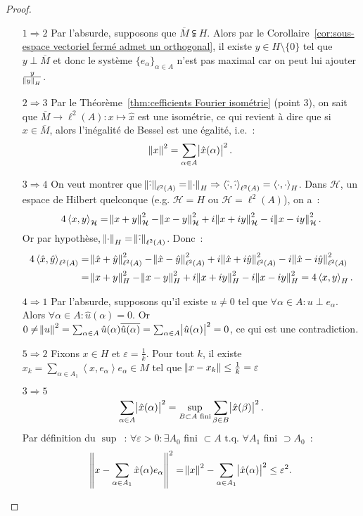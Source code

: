 \documentclass{report}
\newcommand{\scpr}[2]{\left\langle#1, #2\right\rangle}
\newcommand{\tq}{\text{ t.q. }}
\theoremstyle{definition}
\theoremstyle{remark}
\begin{document}
\begin{proof}~
\begin{itemize}
	\item[$1 \Rightarrow 2$] Par l'absurde, supposons que $\overline M \subsetneqq H$. Alors par le Corollaire~\ref{cor:sous-espace vectoriel fermé admet un orthogonal},
	il existe $y \in H \setminus \{0\}$ tel que $y \perp \overline M$ et donc le système $\{e_\alpha\}_{\alpha \in A}$ n'est pas maximal car on peut lui ajouter $\frac y{\norm y_H}$.
	\item[$2 \Rightarrow 3$] Par le Théorème~\ref{thm:cefficients Fourier isométrie} (point 3), on sait que $\overline M \to \ell^2(A) : x \mapsto \hat x$ est une isométrie,
	ce qui revient à dire que si $x \in \overline M$, alors l'inégalité de Bessel est une égalité, i.e.~:
	\[\norm x^2 = \sum_{\alpha \in A}\abs {\hat x(\alpha)}^2.\]
	\item[$3 \Rightarrow 4$] On veut montrer que $\norm {\hat \cdot}_{\ell^2(A)} = \norm \cdot_H \Rightarrow \scpr {\hat \cdot}{\hat \cdot}_{\ell^2(A)} = \scpr \cdot\cdot_H$.
	Dans $\mathcal H$, un espace de Hilbert quelconque (e.g. $\mathcal H = H$ ou $\mathcal H = \ell^2(A)$), on a~:
	\[4\scpr xy_{\mathcal H} = \norm {x+y}^2_{\mathcal H} - \norm {x-y}^2_{\mathcal H} + i\norm {x+iy}^2_{\mathcal H} - i\norm {x-iy}^2_{\mathcal H}.\]
	Or par hypothèse, $\norm \cdot_H = \norm {\hat \cdot}_{\ell^2(A)}$. Donc~:
	\begin{align*}
		4 \scpr {\hat x}{\hat y}_{\ell^2(A)} &= \norm {\hat x+\hat y}^2_{\ell^2(A)} - \norm {\hat x-\hat y}^2_{\ell^2(A)} + i\norm {\hat x+i\hat y}^2_{\ell^2(A)} - i\norm {\hat x-i\hat y}^2_{\ell^2(A)} \\
		&= \norm {x+y}^2_H - \norm {x-y}^2_H + i\norm {x+iy}^2_H - i\norm {x-iy}^2_H = 4\scpr xy_H.
	\end{align*}
	\item[$4 \Rightarrow 1$] Par l'absurde, supposons qu'il existe $u \neq 0$ tel que $\forall \alpha \in A : u \perp e_\alpha$. Alors $\forall \alpha \in A : \hat u(\alpha) = 0$.
	Or $0 \neq \norm u^2 = \sum_{\alpha \in A}\hat u(\alpha)\overline {\hat u(\alpha)} = \sum_{\alpha \in A}\abs {\hat u(\alpha)}^2 = 0$, ce qui est une contradiction.
	\item[$5 \Rightarrow 2$] Fixons $x \in H$ et $\varepsilon = \frac 1k$. Pour tout $k$, il existe $x_k = \sum_{\alpha \in A_1}\scpr x{e_\alpha}e_\alpha \in M$ tel que
	$\norm {x-x_k} \leq \frac 1k = \varepsilon$
	\item[$3 \Rightarrow 5$]
	\[\sum_{\alpha \in A}\abs {\hat x(\alpha)}^2 = \sup_{B \subset A \text{ fini}}\sum_{\beta \in B}\abs {\hat x(\beta)}^2.\]
	Par définition du $\sup$~: $\forall \varepsilon > 0 : \exists A_0$ fini $\subset A \tq \forall A_1$ fini $\supset A_0$~:
	\[\norm {x- \sum_{\alpha \in A_1}\hat x(\alpha)e_\alpha}^2 = \norm x^2 - \sum_{\alpha \in A_1}\abs {\hat x(\alpha)}^2 \leq \varepsilon^2.\]
\end{itemize}
\end{proof}
\end{document}
